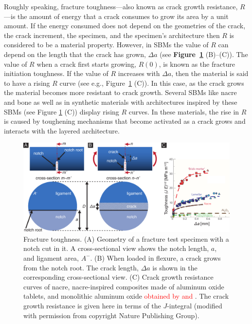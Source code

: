 \documentclass[12pt,onecolumn]{article}
\begin{document}
\begin{bibunit}
Roughly speaking, fracture toughness---also known as crack growth resistance, $R$---is the amount of energy that a crack consumes to grow its area by a unit amount. If the energy consumed does not depend on the geometries of the crack, the crack increment, the specimen, and the specimen's architecture then $R$ is considered to be a material property. However, in SBMs the value of $R$ can depend on the length that the crack has grown, $\Delta a$ (see {\bf Figure~\ref{fig:Rcurve}} (B)--(C)). The value of $R$ when a crack first starts growing, $R(0)$, is known as the fracture initiation toughness. If the value of $R$ increases with $\Delta a$, then the material is said to have a rising $R$ curve (see e.g., Figure~\ref{fig:Rcurve} (C)). In this case, as the crack grows the material becomes more resistant to crack growth. Several SBMs like nacre and bone  \cite{barthelat2007experimental,rabiei2010failure,nalla2005mechanistic,launey2009mechanistic} as well as in synthetic materials with architectures inspired by these SBMs (see Figure \ref{fig:Rcurve} (C)) \cite{ritchie2011conflicts} display rising $R$ curves. In these materials, the rise in $R$ is caused by toughening mechanisms that become activated as a crack grows and interacts with the layered architecture.
%
			\begin{figure}[ht!]
			\centering
			\includegraphics[width=\textwidth]{../Figures/FigureRcurve/Figure3a_V6.pdf}
			\caption{Fracture toughness. (A) Geometry of a fracture test specimen with a notch cut in it. A cross-sectional view shows the notch length, $a$, and ligament area, $A^-$. (B) When loaded in flexure, a crack grows from the notch root. The crack length, $\Delta a$ is shown in the corresponding cross-sectional view. (C) Crack growth resistance curves of nacre, nacre-inspired composites made of aluminum oxide tablets, and monolithic aluminum oxide \textcolor{red}{obtained by \cite{ritchie2011conflicts} and \cite{munch2008tough}}. The crack growth resistance is given here in terms of the $J$-integral (modified with permission from \cite{ritchie2011conflicts} copyright Nature Publishing Group).}
			\label{fig:Rcurve}
			\end{figure}


\end{bibunit}
\end{document}
